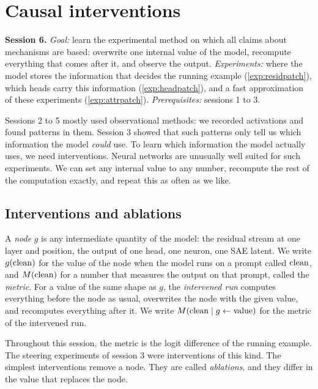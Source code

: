 \section{Causal interventions}
\label{sec:interventions}

\begin{sessioncard}
\textbf{Session 6.} \emph{Goal:} learn the experimental method on which all claims about mechanisms are based:
overwrite one internal value of the model, recompute everything that comes after it, and observe the output.
\emph{Experiments:} where the model stores the information that decides the running example
(\cref{exp:residpatch}), which heads carry this information (\cref{exp:headpatch}), and a fast approximation of
these experiments (\cref{exp:attrpatch}).
\emph{Prerequisites:} sessions 1 to 3.
\end{sessioncard}

Sessions 2 to 5 mostly used observational methods: we recorded activations and found patterns in them. Session
3 showed that such patterns only tell us which information the model \emph{could} use. To learn which information
the model actually uses, we need interventions. Neural networks are unusually well suited for such experiments. We
can set any internal value to any number, recompute the rest of the computation exactly, and repeat this as often
as we
like.

\subsection{Interventions and ablations}

\begin{definition}[Intervention]\label{def:intervention}
A \emph{node} $g$ is any intermediate quantity of the model: the residual stream at one layer and position, the
output of one head, one neuron, one SAE latent. We write $g(\mathrm{clean})$ for the value of the node when the model
runs on a prompt called $\mathrm{clean}$, and $M(\mathrm{clean})$ for a number that measures the output on that prompt, called the
\emph{metric}. For a value of the same shape as $g$, the \emph{intervened run} computes everything before the
node as usual, overwrites the node with the given value, and recomputes everything after it. We write
$M(\mathrm{clean} \mid g\leftarrow\text{value})$ for the metric of the intervened run.
\end{definition}

Throughout this session, the metric is the logit difference of the running example. The steering experiments of
session 3 were interventions of this kind. The simplest interventions remove a node. They are called
\emph{ablations}, and they differ in the value that replaces the node.

